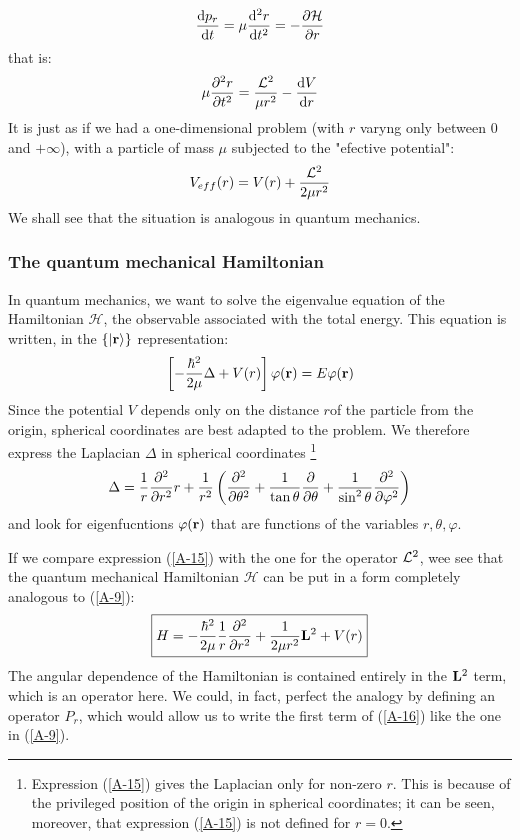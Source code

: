 \begin{equation}\label{A-12a}
	\dv{p_r}{t}=\mu\dv[2]{r}{t}=-\pdv{\mathcal{H}}{r}
\end{equation}
that is:
\begin{equation}\label{A-12b}
	\mu\pdv[2]{r}{t}=\frac{\vb{\mathcal{L}}^2}{\mu r^2}-\dv{V}{r}
\end{equation}
It is just as if we had a one-dimensional problem (with $r$ varyng only between $0$ and $+\infty$), with a particle of mass $\mu$ subjected to the "efective potential":
\begin{equation}\label{A-13}
	V_{eff}(r)=V(r)+\frac{\vb{\mathcal{L}}^2}{2\mu r^2}
\end{equation}
We shall see that the situation is analogous in quantum mechanics.


\subsubsection{The quantum mechanical Hamiltonian}
In quantum mechanics, we want to solve the eigenvalue equation of the Hamiltonian $\mathcal{H}$, the observable associated with the total energy. This equation is written, in the $\{\ket{\vb{r}}\}$ representation:
\begin{equation}\label{A-14}
	\left[-\frac{\hbar^2}{2\mu}\Delta +V(r)\right]\varphi(\vb{r}) = E\varphi(\vb{r})
\end{equation}
Since the potential $V$ depends only on the distance  $r $of the particle from the origin, spherical coordinates are best adapted to the problem. We therefore express the Laplacian $\Delta$ in spherical coordinates \footnote{Expression (\ref{A-15}) gives the Laplacian only for non-zero $r$. This is because of the privileged position of the origin in spherical coordinates; it can be seen, moreover, that expression (\ref{A-15}) is not defined for $r=0$.}
\begin{equation}\label{A-15}
	\Delta = \frac{1}{r}\pdv[2]{r}r+\frac{1}{r^2}\left(\pdv[2]{\theta} +\frac{1}{\tan\theta}\pdv{\theta}+\frac{1}{\sin^2\theta}\pdv[2]{\varphi}\right)
\end{equation}
and look for eigenfucntions $\varphi(\vb{r})$ that are functions of the variables $r,\theta,\varphi$.

If we compare expression (\ref{A-15}) with the one for the operator $\vb{\mathcal{L}}^2$, wee see that the quantum mechanical Hamiltonian $\mathcal{H}$ can be put in a form completely analogous to (\ref{A-9}):
\begin{equation}\label{A-16}
	\boxed{H=-\frac{\hbar^2}{2\mu}\frac{1}{r}\pdv[2]{r}+\frac{1}{2\mu r^2}\vb{L}^2+V(r)}
\end{equation}
The angular dependence of the Hamiltonian is contained entirely in the $\vb{L}^2$ term, which is an operator here. We could, in fact, perfect the analogy by defining an operator $P_r$, which would allow us to write the first term of (\ref{A-16}) like the one in (\ref{A-9}).

